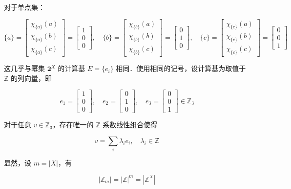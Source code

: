 \documentclass[10pt, openany]{book}
\begin{document}
对于单点集：

$$
\{a\} = \begin{bmatrix}\chi_{\{a\}}(a)\\ \chi_{\{a\}}(b) \\ \chi_{\{a\}}(c)\end{bmatrix} = \begin{bmatrix}1\\ 0 \\ 0\end{bmatrix},\quad
\{b\} = \begin{bmatrix}\chi_{\{b\}}(a)\\ \chi_{\{b\}}(b) \\ \chi_{\{b\}}(c)\end{bmatrix} = \begin{bmatrix}0\\ 1 \\ 0\end{bmatrix},\quad
\{c\} = \begin{bmatrix}\chi_{\{c\}}(a)\\ \chi_{\{c\}}(b) \\ \chi_{\{c\}}(c)\end{bmatrix} = \begin{bmatrix}0\\ 0 \\ 1\end{bmatrix}
$$

这几乎与幂集 $\mathbf{2}^X$ 的计算基 $E = \{e_i\}$ 相同．使用相同的记号，设计算基为取值于 $\mathbb Z$ 的列向量，即

$$
e_1 = \begin{bmatrix}1\\0\\0\end{bmatrix},\quad 
e_2 = \begin{bmatrix}0\\1\\0\end{bmatrix},\quad 
e_3 = \begin{bmatrix}0\\0\\1\end{bmatrix} \in \mathbb Z_3
$$

对于任意 $v \in \mathbb Z_3$，存在唯一的 $\mathbb Z$ 系数线性组合使得

$$
v = \sum_i \lambda_i e_i,\quad \lambda_i \in \mathbb Z
$$

显然，设 $m = |X|$，有

$$
|\mathbb Z_m| = |\mathbb Z|^m = |\mathbb Z^X|
$$
\end{document}
